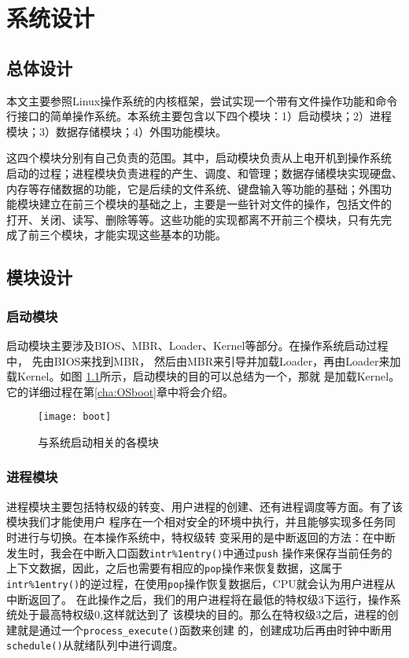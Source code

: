 \chapter{系统设计}

\section{总体设计}
\label{sec:overalldesign}

本文主要参照Linux操作系统的内核框架，尝试实现一个带有文件操作功能和命令
行接口的简单操作系统。本系统主要包含以下四个模块：1）启动模块；2）进程
模块；3）数据存储模块；4）外围功能模块。

这四个模块分别有自己负责的范围。其中，启动模块负责从上电开机到操作系统
启动的过程；进程模块负责进程的产生、调度、和管理；数据存储模块实现硬盘、
内存等存储数据的功能，它是后续的文件系统、键盘输入等功能的基础；外围功
能模块建立在前三个模块的基础之上，主要是一些针对文件的操作，包括文件的
打开、关闭、读写、删除等等。这些功能的实现都离不开前三个模块，只有先完
成了前三个模块，才能实现这些基本的功能。

\section{模块设计}

\subsection{启动模块}

启动模块主要涉及BIOS、MBR、Loader、Kernel等部分。在操作系统启动过程中，
先由BIOS来找到MBR，
然后由MBR来引导并加载Loader，再由Loader来加载Kernel。如图
\ref{fig:boot}所示，启动模块的目的可以总结为一个，那就
是加载Kernel。它的详细过程在第\ref{cha:OSboot}章中将会介绍。

\begin{figure}[H]
  \centering
  \texttt{[image: boot]}
  \caption{与系统启动相关的各模块}
  \label{fig:boot}
\end{figure}

\subsection{进程模块}

进程模块主要包括特权级的转变、用户进程的创建、还有进程调度等方面。有了该模块我们才能使用户
程序在一个相对安全的环境中执行，并且能够实现多任务同时进行与切换。在本操作系统中，特权级转
变采用的是中断返回的方法：在中断发生时，我会在中断入口函数\texttt{intr\%1entry()}中通过\texttt{push}
操作来保存当前任务的上下文数据，因此，之后也需要有相应的\texttt{pop}操作来恢复数据，这属于
\texttt{intr\%1entry()}的逆过程，在使用\texttt{pop}操作恢复数据后，CPU就会认为用户进程从中断返回了。
在此操作之后，我们的用户进程将在最低的特权级3下运行，操作系统处于最高特权级0,这样就达到了
该模块的目的。那么在特权级3之后，进程的创建就是通过一个\texttt{process\_execute()}函数来创建
的，创建成功后再由时钟中断用\texttt{schedule()}从就绪队列中进行调度。

